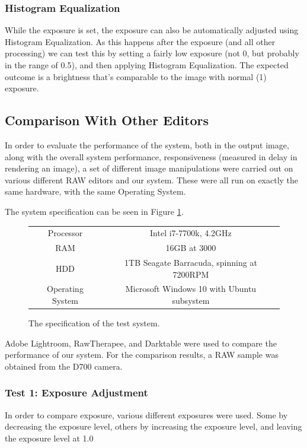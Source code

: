 \documentclass[10pt,a4paper]{article}
\begin{document}
\subsubsection{Histogram Equalization}
While the exposure is set, the exposure can also be automatically adjusted using Histogram Equalization. As this happens after the exposure (and all other processing)
we can test this by setting a fairly low exposure (not 0, but probably in the range of 0.5), and then applying Histogram Equalization. The expected outcome is a brightness
that's comparable to the image with normal (1) exposure.


\subsection{Comparison With Other Editors}
In order to evaluate the performance of the system, both in the output image, along with the overall system performance,
responsiveness (measured in delay in rendering an image), a set of different image manipulations were carried out on various
different RAW editors and our system. These were all run on exactly the same hardware, with the same Operating System.

The system specification can be seen in Figure \ref{SystemSpecs}.

\begin{figure}\label{SystemSpecs}
    \centering
    \begin{tabular}{| c | c |}
        \hline
        Processor & Intel i7-7700k, 4.2GHz\\
        RAM & 16GB at 3000\\
        HDD & 1TB Seagate Barracuda, spinning at 7200RPM\\
        Operating System & Microsoft Windows 10 with Ubuntu subsystem\\
        \hline
    \end{tabular}
    \caption{The specification of the test system.}
\end{figure}

Adobe Lightroom, RawTherapee, and Darktable were used to compare the performance of our system. For the comparison results,
a RAW sample was obtained from the D700 camera.

\subsubsection{Test 1: Exposure Adjustment}
In order to compare exposure, various different exposures were used. Some by decreasing the exposure level, others by
increasing the exposure level, and leaving the exposure level at 1.0
\end{document}
